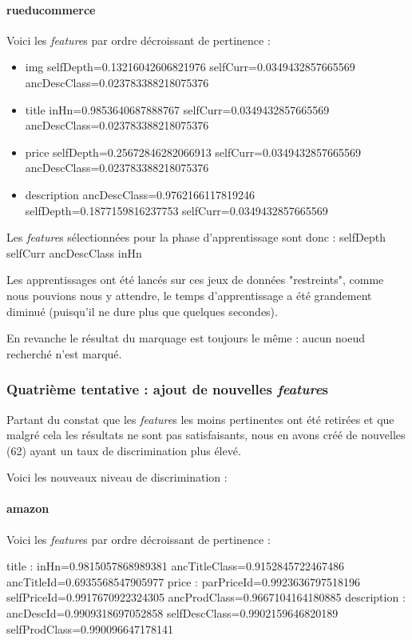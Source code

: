 \documentclass{article}
\begin{document}
\paragraph{rueducommerce}
Voici les \emph{feature}s par ordre décroissant de pertinence :
\begin{itemize}
    \item{img} selfDepth=0.13216042606821976 selfCurr=0.0349432857665569 ancDescClass=0.023783388218075376
    \item{title} inHn=0.9853640687888767 selfCurr=0.0349432857665569 ancDescClass=0.023783388218075376
    \item{price} selfDepth=0.25672846282066913 selfCurr=0.0349432857665569 ancDescClass=0.023783388218075376
    \item{description} ancDescClass=0.9762166117819246 selfDepth=0.1877159816237753 selfCurr=0.0349432857665569
\end{itemize}

Les \emph{feature}s sélectionnées pour la phase d'apprentissage sont donc :
selfDepth selfCurr ancDescClass inHn

Les apprentissages ont été lancés sur ces jeux de données "restreints", comme nous
pouvions nous y attendre, le temps d'apprentissage a été grandement diminué (puisqu'il
ne dure plus que quelques secondes).

En revanche le résultat du marquage est toujours le même : aucun noeud recherché n'est
marqué.

\subsubsection{Quatrième tentative : ajout de nouvelles \emph{feature}s}
Partant du constat que les \emph{feature}s les moins pertinentes ont été retirées
et que malgré cela les résultats ne sont pas satisfaisants, nous en avons créé de
nouvelles (62) ayant un taux de discrimination plus élevé.

Voici les nouveaux niveau de discrimination :

\paragraph{amazon}
Voici les \emph{feature}s par ordre décroissant de pertinence :
\begin{itemize}
title : inHn=0.9815057868989381 ancTitleClass=0.9152845722467486 ancTitleId=0.6935568547905977
price : parPriceId=0.9923636797518196 selfPriceId=0.9917670922324305 ancProdClass=0.9667104164180885
description : ancDescId=0.9909318697052858 selfDescClass=0.9902159646820189 selfProdClass=0.990096647178141
\end{itemize}
\end{document}
